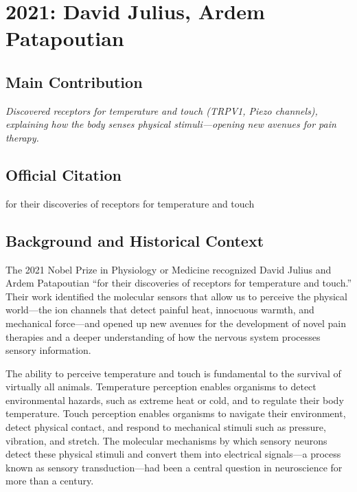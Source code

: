 \chapter[2021 --- Julius et al.]{2021: David Julius, Ardem Patapoutian}
\label{ch:2021_Julius}

\section*{Main Contribution}

\textit{Discovered receptors for temperature and touch (TRPV1, Piezo channels), explaining how the body senses physical stimuli---opening new avenues for pain therapy.}\cite{nobel-2021,lecture-2021}

\section{Official Citation}

for their discoveries of receptors for temperature and touch

\section{Background and Historical Context}

The 2021 Nobel Prize in Physiology or Medicine recognized David Julius and Ardem Patapoutian ``for their discoveries of receptors for temperature and touch.'' Their work identified the molecular sensors that allow us to perceive the physical world---the ion channels that detect painful heat, innocuous warmth, and mechanical force---and opened up new avenues for the development of novel pain therapies and a deeper understanding of how the nervous system processes sensory information.

The ability to perceive temperature and touch is fundamental to the survival of virtually all animals. Temperature perception enables organisms to detect environmental hazards, such as extreme heat or cold, and to regulate their body temperature. Touch perception enables organisms to navigate their environment, detect physical contact, and respond to mechanical stimuli such as pressure, vibration, and stretch. The molecular mechanisms by which sensory neurons detect these physical stimuli and convert them into electrical signals---a process known as sensory transduction---had been a central question in neuroscience for more than a century.

